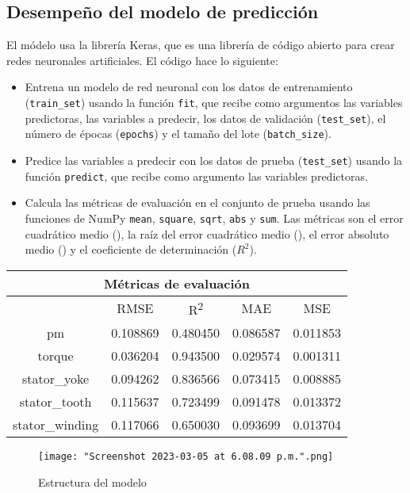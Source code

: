 \documentclass{article}
\begin{document}
\subsection{Desempeño del modelo de predicción}

El módelo usa la librería Keras, que es una librería de código abierto para crear redes neuronales artificiales. El código hace lo siguiente:

\begin{itemize}
\item Entrena un modelo de red neuronal con los datos de entrenamiento (\lstinline{train_set}) usando la función \lstinline{fit}, que recibe como argumentos las variables predictoras, las variables a predecir, los datos de validación (\lstinline{test_set}), el número de épocas (\lstinline{epochs}) y el tamaño del lote (\lstinline{batch_size}).
\item Predice las variables a predecir con los datos de prueba (\lstinline{test_set}) usando la función \lstinline{predict}, que recibe como argumento las variables predictoras.
\item Calcula las métricas de evaluación en el conjunto de prueba usando las funciones de NumPy \lstinline{mean}, \lstinline{square}, \lstinline{sqrt}, \lstinline{abs} y \lstinline{sum}. Las métricas son el error cuadrático medio (), la raíz del error cuadrático medio (), el error absoluto medio () y el coeficiente de determinación ($R^{2}$).
\end{itemize}

\usepackage{booktabs}
\begin{center}
\begin{tabular}{ |c|c|c|c|c| }
\toprule
\multicolumn{5}{|c|}{Métricas de evaluación} \\
\midrule
& RMSE & R\textsuperscript{2} & MAE & MSE \\
\midrule
pm & 0.108869 & 0.480450 & 0.086587 & 0.011853 \\
torque & 0.036204 & 0.943500 & 0.029574 & 0.001311 \\
stator\_yoke & 0.094262 & 0.836566 & 0.073415 & 0.008885 \\
stator\_tooth & 0.115637 & 0.723499 & 0.091478 & 0.013372 \\
stator\_winding & 0.117066 & 0.650030 & 0.093699 & 0.013704 \\
\bottomrule
\end{tabular}
\end{center}

\begin{figure}[htbp]
\centering
\caption{Estructura del modelo}
\texttt{[image: "Screenshot 2023-03-05 at 6.08.09 p.m.".png]}
\end{figure}
\end{document}
